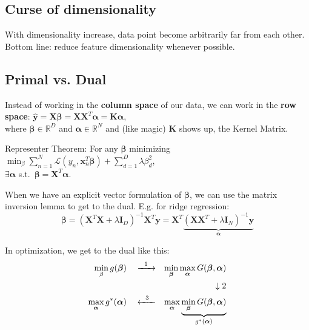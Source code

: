 \documentclass[10pt,a4paper,landscape]{article}
\renewcommand{\bf}[1]{\ensuremath{\mathbf{#1}}}
\newcommand{\balpha}{\boldsymbol\alpha}
\newcommand{\bbeta}{\boldsymbol\beta}
\newcommand{\st}{s.t.}
\begin{document}
\begin{multicols*}{4}
\subsection{Curse of dimensionality}
With dimensionality increase, data point become arbitrarily far from each other. %
Bottom line: reduce feature dimensionality whenever possible.

\subsection{Primal vs. Dual}
Instead of working in the \textbf{column space} of our data, we can work in the \textbf{row space}:
$\hat{\bf{y}} = \bf{X} \bbeta = \bf{X X}^T \balpha = \bf{K} \balpha$,\\
where $\bbeta \in \mathbb{R}^D$ and $\balpha \in \mathbb{R}^N$
and (like magic) $\bf{K}$ shows up, the Kernel Matrix.

Representer Theorem: For any $\bbeta$ minimizing
$\min_\beta \sum_{n=1}^N \mathcal{L}(y_n, \bf{x}_n^T \bbeta) + \sum_{d=1}^D \lambda \beta_d^2$,\\
$\exists \balpha$ \st\ $\bbeta = \bf{X}^T \balpha$.

When we have an explicit vector formulation of $\bbeta$, we can use the matrix inversion lemma to get to the dual. E.g. for ridge regression:
$$\bbeta = (\bf{X}^T \bf{X}  + \lambda \bf{I}_D)^{-1} \bf{X}^T \bf{y}= \bf{X}^T \underbrace{(\bf{X X}^T + \lambda \bf{I}_N)^{-1} \bf{y}}_{\balpha}$$

In optimization, we get to the dual like this:
\begin{align*}
\min_\beta g(\bbeta) & \quad \xrightarrow{\hspace*{0.2cm}1\hspace*{0.2cm}} & \min_{\bbeta}\max_{\balpha}G(\bbeta, \balpha)\\
 & & \downarrow 2 \\
\max_{\balpha}g^*(\balpha) & \quad \xleftarrow{\hspace*{0.2cm}3\hspace*{0.2cm}} & \max_{\balpha}\underbrace{\min_{\bbeta}G(\bbeta, \balpha)}_{g^*(\balpha)}
\end{align*}


\end{multicols*}
\end{document}
